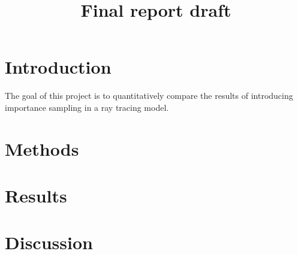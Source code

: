 \documentclass[12pt]{article}
\title{Final report draft}
\begin{document}
\maketitle
\begin{abstract}

\end{abstract}

\section{Introduction}
	The goal of this project is to quantitatively compare the results of introducing importance sampling in a ray tracing model.
    
\section{Methods}



\section{Results}

\section{Discussion}
\end{document}
